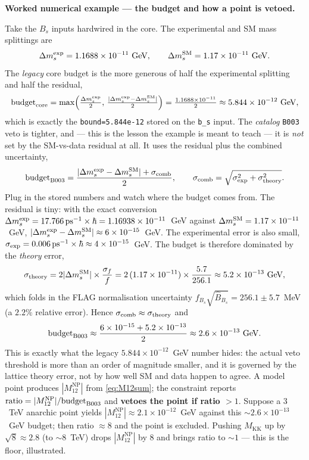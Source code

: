 \documentclass[11pt]{article}
\newenvironment{callout}[1]{%
  \par\medskip\begin{shaded}\noindent\textbf{#1}\par\smallskip}{\end{shaded}\medskip}
\newcommand{\MKK}{M_{\mathrm{KK}}}
\newcommand{\code}[1]{\texttt{#1}}
\newcommand{\Bs}{B_s}
\newcommand{\dms}{\Delta m_s}
\newcommand{\MtwelveNP}{M_{12}^{\mathrm{NP}}}
\theoremstyle{definition}
\begin{document}
\begin{callout}{Worked numerical example --- the budget and how a point is vetoed.}
Take the $\Bs$ inputs hardwired in the core. The experimental and SM mass
splittings are
\[
\dms^{\rm exp} = 1.1688\times10^{-11}\ \text{GeV},\qquad
\dms^{\rm SM} = 1.17\times10^{-11}\ \text{GeV}.
\]
The \emph{legacy} core budget is the more generous of half the experimental
splitting and half the residual,
\[
\text{budget}_{\rm core} = \max\!\Big(\tfrac{\dms^{\rm exp}}{2},\,
\tfrac{|\dms^{\rm exp}-\dms^{\rm SM}|}{2}\Big)
= \tfrac{1.1688\times10^{-11}}{2} \approx 5.844\times10^{-12}\ \text{GeV},
\]
which is exactly the \code{bound=5.844e-12} stored on the \code{b\_s} input. The
\emph{catalog} \code{B003} veto is tighter, and --- this is the lesson the
example is meant to teach --- it is \emph{not} set by the SM-vs-data residual at
all. It uses the residual plus the combined uncertainty,
\[
\text{budget}_{\rm B003} = \frac{|\dms^{\rm exp}-\dms^{\rm SM}| + \sigma_{\rm comb}}{2},
\qquad
\sigma_{\rm comb} = \sqrt{\sigma_{\rm exp}^2 + \sigma_{\rm theory}^2}.
\]
Plug in the stored numbers and watch where the budget comes from. The residual is
tiny: with the exact conversion $\dms^{\rm exp}=17.766\,\mathrm{ps}^{-1}\times
\hbar = 1.16938\times10^{-11}$~GeV against $\dms^{\rm SM}=1.17\times10^{-11}$~GeV,
$|\dms^{\rm exp}-\dms^{\rm SM}| \approx 6\times10^{-15}$~GeV. The experimental
error is also small, $\sigma_{\rm exp} = 0.006\,\mathrm{ps}^{-1}\times\hbar
\approx 4\times10^{-15}$~GeV. The budget is therefore dominated by the
\emph{theory} error,
\[
\sigma_{\rm theory} = 2|\dms^{\rm SM}|\times\frac{\sigma_f}{f}
= 2\,(1.17\times10^{-11})\times\frac{5.7}{256.1} \approx 5.2\times10^{-13}\ \text{GeV},
\]
which folds in the FLAG normalisation uncertainty
$f_{\Bs}\sqrt{\hat B_{\Bs}} = 256.1\pm5.7$~MeV (a $2.2\%$ relative error). Hence
$\sigma_{\rm comb}\approx\sigma_{\rm theory}$ and
\[
\text{budget}_{\rm B003}\approx
\frac{6\times10^{-15} + 5.2\times10^{-13}}{2} \approx 2.6\times10^{-13}\ \text{GeV}.
\]
This is exactly what the legacy $5.844\times10^{-12}$~GeV number hides: the actual
veto threshold is more than an order of magnitude smaller, and it is governed by
the lattice theory error, not by how well SM and data happen to agree.
A model point produces $|\MtwelveNP|$ from
\eqref{eq:M12sum}; the constraint reports
$\text{ratio} = |\MtwelveNP|/\text{budget}_{\rm B003}$ and
\textbf{vetoes the point if ratio $>1$}. Suppose a $3$~TeV anarchic point yields
$|\MtwelveNP| \approx 2.1\times10^{-12}$~GeV against this
$\sim 2.6\times10^{-13}$~GeV budget; then ratio $\approx 8$ and the point is
excluded. Pushing $\MKK$ up by $\sqrt{8}\approx 2.8$ (to $\sim 8$~TeV) drops
$|\MtwelveNP|$ by $8$ and brings ratio to $\sim 1$ --- this is the floor,
illustrated.
\end{callout}
\end{document}
